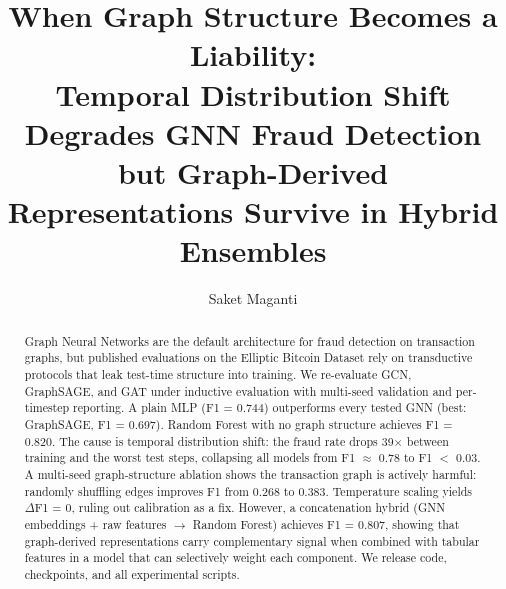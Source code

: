 \documentclass[12pt,a4paper]{article}
\title{When Graph Structure Becomes a Liability: \\
  Temporal Distribution Shift Degrades GNN Fraud Detection \\
  but Graph-Derived Representations Survive in Hybrid Ensembles}
\author{Saket Maganti}
\date{}
\begin{document}
\maketitle

\begin{abstract}
Graph Neural Networks are the default architecture for fraud detection
on transaction graphs, but published evaluations on the Elliptic
Bitcoin Dataset rely on transductive protocols that leak test-time
structure into training.  We re-evaluate GCN, GraphSAGE, and GAT under
inductive evaluation with multi-seed validation and per-timestep
reporting.  A plain MLP (F1 = 0.744) outperforms every tested GNN
(best: GraphSAGE, F1 = 0.697).  Random Forest with no graph structure
achieves F1 = 0.820.  The cause is temporal distribution shift: the
fraud rate drops 39$\times$ between training and the worst test steps,
collapsing all models from F1 $\approx$ 0.78 to F1 $<$ 0.03.  A
multi-seed graph-structure ablation shows the transaction graph is
actively harmful: randomly shuffling edges improves F1 from 0.268 to
0.383.  Temperature scaling yields $\Delta$F1 = 0, ruling out
calibration as a fix.  However, a concatenation hybrid (GNN embeddings
+ raw features $\to$ Random Forest) achieves F1 = 0.807, showing that
graph-derived representations carry complementary signal when combined
with tabular features in a model that can selectively weight each
component.  We release code, checkpoints, and all experimental scripts.
\end{abstract}





\end{document}
